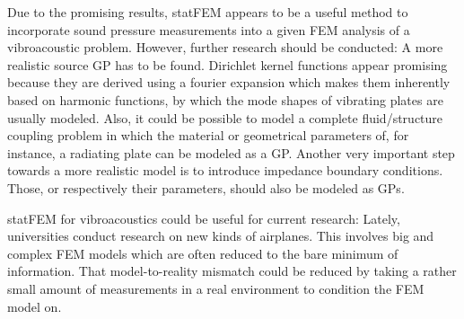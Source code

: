 \documentclass[%
  a4paper,oneside,%
  11pt,%
  smallchapters,
  style=printdev,
  extramargin,
  green,%
  rgb, <cmyk>
  ]{tubsbook}
\begin{document}
Due to the promising results, statFEM appears to be a useful method to incorporate sound pressure measurements into a given FEM analysis of a vibroacoustic problem. However, further research should be conducted: A more realistic source GP has to be found. Dirichlet kernel functions appear promising because they are derived using a fourier expansion which makes them inherently based on harmonic functions, by which the mode shapes of vibrating plates are usually modeled. Also, it could be possible to model a complete fluid/structure coupling problem in which the material or geometrical parameters of, for instance, a radiating plate can be modeled as a GP. Another very important step towards a more realistic model is to introduce impedance boundary conditions. Those, or respectively their parameters, should also be modeled as GPs. 

statFEM for vibroacoustics could be useful for current research: Lately, universities conduct research on new kinds of airplanes. This involves big and complex FEM models which are often reduced to the bare minimum of information. That model-to-reality mismatch could be reduced by taking a rather small amount of measurements in a real environment to condition the FEM model on. 
\end{document}
